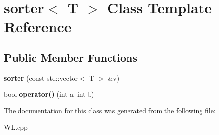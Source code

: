 \hypertarget{classsorter}{\section{sorter$<$ T $>$ Class Template Reference}
\label{classsorter}
}
\subsection*{Public Member Functions}
\begin{DoxyCompactItemize}
\item 
\hypertarget{classsorter_abb8ae32e511bdb671a138edac6d34242}{{\bfseries sorter} (const std\-::vector$<$ T $>$ \&v)}\label{classsorter_abb8ae32e511bdb671a138edac6d34242}

\item 
\hypertarget{classsorter_aa9f76153f9ed38a9c1f808b224e0f0ae}{bool {\bfseries operator()} (int a, int b)}\label{classsorter_aa9f76153f9ed38a9c1f808b224e0f0ae}

\end{DoxyCompactItemize}


The documentation for this class was generated from the following file\-:\begin{DoxyCompactItemize}
\item 
W\-L.\-cpp\end{DoxyCompactItemize}
